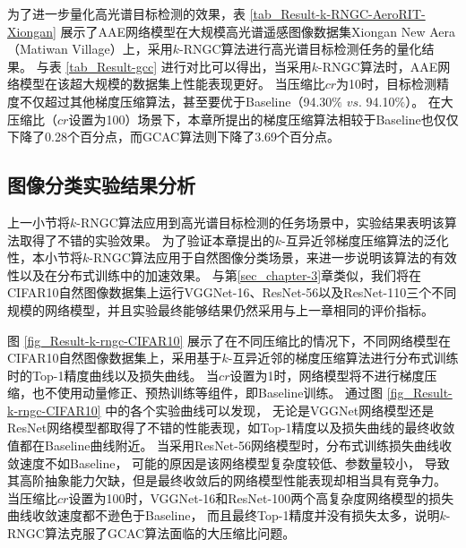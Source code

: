 \documentclass{xdupgthesis}
\begin{document}
为了进一步量化高光谱目标检测的效果，表 \ref*{tab_Result-k-RNGC-AeroRIT-Xiongan} 展示了AAE网络模型在大规模高光谱遥感图像数据集Xiongan New Aera（Matiwan Village）上，采用$k$-RNGC算法进行高光谱目标检测任务的量化结果。
与表 \ref*{tab_Result-gcc} 进行对比可以得出，当采用$k$-RNGC算法时，AAE网络模型在该超大规模的数据集上性能表现更好。
当压缩比$cr$为10时，目标检测精度不仅超过其他梯度压缩算法，甚至要优于Baseline（94.30$\%$ $vs.$ 94.10$\%$）。
在大压缩比（$cr$设置为100）场景下，本章所提出的梯度压缩算法相较于Baseline也仅仅下降了0.28个百分点，而GCAC算法则下降了3.69个百分点。


\subsection{图像分类实验结果分析}
上一小节将$k$-RNGC算法应用到高光谱目标检测的任务场景中，实验结果表明该算法取得了不错的实验效果。
为了验证本章提出的$k$-互异近邻梯度压缩算法的泛化性，本小节将$k$-RNGC算法应用于自然图像分类场景，来进一步说明该算法的有效性以及在分布式训练中的加速效果。
与第\ref*{sec_chapter-3}章类似，我们将在CIFAR10自然图像数据集上运行VGGNet-16、ResNet-56以及ResNet-110三个不同规模的网络模型，并且实验最终能够结果仍然采用与上一章相同的评价指标。

图 \ref*{fig_Result-k-rngc-CIFAR10} 展示了在不同压缩比的情况下，不同网络模型在CIFAR10自然图像数据集上，采用基于$k$-互异近邻的梯度压缩算法进行分布式训练时的Top-1精度曲线以及损失曲线。
当$cr$设置为1时，网络模型将不进行梯度压缩，也不使用动量修正、预热训练等组件，即Baseline训练。
通过图 \ref*{fig_Result-k-rngc-CIFAR10} 中的各个实验曲线可以发现，
无论是VGGNet网络模型还是ResNet网络模型都取得了不错的性能表现，如Top-1精度以及损失曲线的最终收敛值都在Baseline曲线附近。
当采用ResNet-56网络模型时，分布式训练损失曲线收敛速度不如Baseline，
可能的原因是该网络模型复杂度较低、参数量较小，
导致其高阶抽象能力欠缺，但是最终收敛后的网络模型性能表现却相当具有竞争力。
当压缩比$cr$设置为100时，VGGNet-16和ResNet-100两个高复杂度网络模型的损失曲线收敛速度都不逊色于Baseline，
而且最终Top-1精度并没有损失太多，说明$k$-RNGC算法克服了GCAC算法面临的大压缩比问题。
\end{document}
